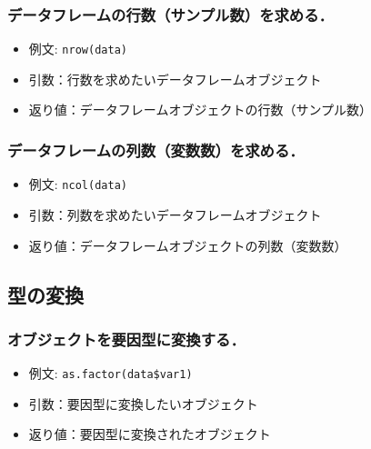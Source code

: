 \documentclass[
  xelatex, ja=standard]{bxjsarticle}
\providecommand{\tightlist}{%
  \setlength{\itemsep}{0pt}\setlength{\parskip}{0pt}}
\begin{document}
\subsubsection{データフレームの行数（サンプル数）を求める．}\label{ux30c7ux30fcux30bfux30d5ux30ecux30fcux30e0ux306eux884cux6570ux30b5ux30f3ux30d7ux30ebux6570ux3092ux6c42ux3081ux308b}

\begin{itemize}
\tightlist
\item
  例文: \texttt{nrow(data)}
\item
  引数：行数を求めたいデータフレームオブジェクト
\item
  返り値：データフレームオブジェクトの行数（サンプル数）
\end{itemize}

\subsubsection{データフレームの列数（変数数）を求める．}\label{ux30c7ux30fcux30bfux30d5ux30ecux30fcux30e0ux306eux5217ux6570ux5909ux6570ux6570ux3092ux6c42ux3081ux308b}

\begin{itemize}
\tightlist
\item
  例文: \texttt{ncol(data)}
\item
  引数：列数を求めたいデータフレームオブジェクト
\item
  返り値：データフレームオブジェクトの列数（変数数）
\end{itemize}

\subsection{型の変換}\label{ux578bux306eux5909ux63db}

\subsubsection{オブジェクトを要因型に変換する．}\label{ux30aaux30d6ux30b8ux30a7ux30afux30c8ux3092ux8981ux56e0ux578bux306bux5909ux63dbux3059ux308b}

\begin{itemize}
\tightlist
\item
  例文: \texttt{as.factor(data\$var1)}
\item
  引数：要因型に変換したいオブジェクト
\item
  返り値：要因型に変換されたオブジェクト
\end{itemize}
\end{document}
